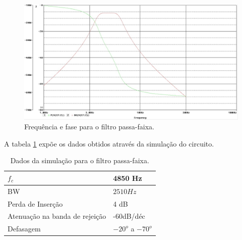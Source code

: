\begin{figure}[H]
 \centering
 \label{fRFPF2}
 \includegraphics[scale=0.5]{Imagens/rfpf2.jpg}
 \caption{Frequência e fase para o filtro passa-faixa.}
 \end{figure}
  
A tabela \ref{tFPF2} expõe os dados obtidos através da simulação do circuito.

\begin{small}
\begin{table}[H]
\begin{center}
\caption{Dados da simulação para o filtro passa-faixa.}

\begin{tabular}{l|l}
\hline
\hline
$f_c$ & 4850 Hz\\
\hline
BW & $2510 Hz$\\
\hline
Perda de Inserção & 4 dB\\
\hline
Atenuação na banda de rejeição & -60dB/déc \\
\hline
Defasagem & $-20^o$ a $-70^o$\\
\hline
\hline
\end{tabular}

\label{tFPF2}
\end{center}
\end{table}
\end{small}